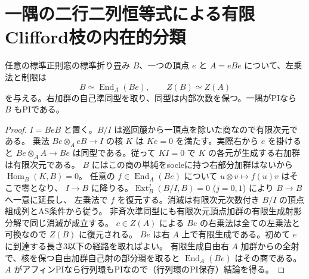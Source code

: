 \section{一隅の二行二列恒等式による有限Clifford枝の内在的分類}
\label{sec:one-corner-clifford-classification}
\begin{proposition}\label{prop:all-window-corner-center}
任意の標準正則窓の標準折り畳み $B$、一つの頂点 $e$ と $A=eBe$ について、左乗法と制限は
\[
        B\simeq\operatorname{End}_{A}(Be),\qquad Z(B)\simeq Z(A)
\]
を与える。右加群の自己準同型を取り、同型は内部次数を保つ。一隅がPIなら $B$ もPIである。
\end{proposition}
\begin{proof}
$I=BeB$ と置く。$B/I$ は巡回箙から一頂点を除いた商なので有限次元である。
乗法 $Be\otimes_A eB\to I$ の核 $K$ は $Ke=0$ を満たす。実際右から $e$ を掛けると
$Be\otimes_A A\to Be$ は同型である。従って $KI=0$ で $K$ の各元が生成する右加群は有限次元である。
$B$ にはこの商の単純をsocleに持つ右部分加群はないから $\operatorname{Hom}_B(K,B)=0$。
任意の $f\in\operatorname{End}_A(Be)$ について $u\otimes v\mapsto f(u)v$ はそこで零となり、
$I\to B$ に降りる。$\operatorname{Ext}^j_B(B/I,B)=0$ ($j=0,1$) により $B\to B$ へ一意に延長し、
左乗法で $f$ を復元する。消滅は有限次元次数付き $B/I$ の頂点組成列とAS条件から従う。
非斉次準同型にも有限次元頂点加群の有限生成射影分解で同じ消滅が成立する。
$c\in Z(A)$ による $Be$ の右乗法は全ての左乗法と可換なので $Z(B)$ に復元される。
$Be$ は右 $A$ 上で有限生成である。初めて $e$ に到達する長さ3以下の経路を取ればよい。
有限生成自由右 $A$ 加群からの全射で、核を保つ自由加群自己射の部分環を取ると
$\operatorname{End}_A(Be)$ はその商である。$A$ がアフィンPIなら行列環もPIなので（行列環のPI保存）結論を得る。
\end{proof}

